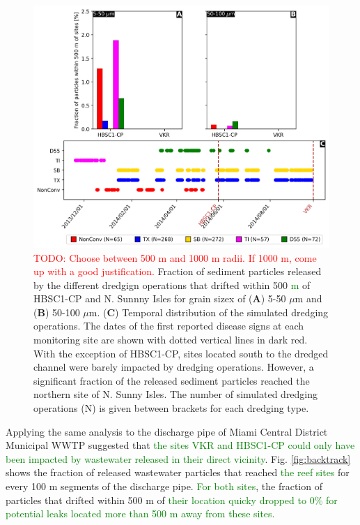 \documentclass[preprint,12pt,authoryear]{elsarticle}
\newcommand{\todo}[1]{\textcolor{red}{TODO: #1}}
\newcommand{\modif}[1]{\textcolor{green}{#1}}
\begin{document}
\begin{figure}
	\centering
	\includegraphics[width=.98\textwidth]{figures/aggregated_stokes4_500m_timeline.png}
	\caption{\todo{Choose between 500 m and 1000 m radii. If 1000 m, come up with a good justification.} Fraction of sediment particles released by the different dredgign operations that drifted within 500 \modif{m} of HBSC1-CP and N. Sunnny Isles for grain sizex of (\textbf{A}) 5-50 $\mu$m  and (\textbf{B}) 50-100 $\mu$m. (\textbf{C}) Temporal distribution of the simulated dredging operations. The dates of the first reported disease signs at each monitoring site are shown with dotted vertical lines in dark red. With the exception of HBSC1-CP, sites located south to the dredged channel were barely impacted by dredging operations. However, a significant fraction of the released sediment particles reached the northern site of N. Sunny Isles. The number of simulated dredging operations (N) is given between brackets for each dredging type.}
	\label{fig:onset_bar}
\end{figure}

Applying the same analysis to the discharge pipe of Miami Central District Municipal WWTP suggested that \modif{the sites VKR and HBSC1-CP could only have been impacted by wastewater released in their direct vicinity}. Fig. \ref{fig:backtrack} shows the fraction of released wastewater particles that reached \modif{the reef sites} for every 100 m segments of the discharge pipe. \modif{For both sites}, the fraction of particles that drifted within 500 m of \modif{their location quicky dropped to 0\% for potential leaks located more than 500 m away from these sites.}
\end{document}
